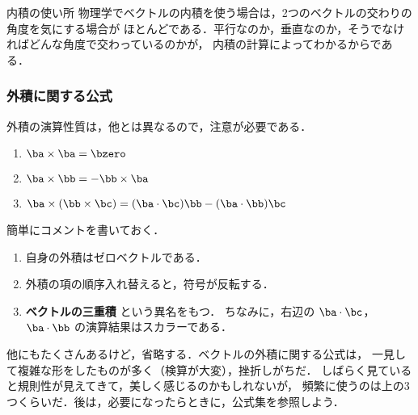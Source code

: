             \begin{mysmallsec}{内積の使い所}
                物理学でベクトルの内積を使う場合は，2つのベクトルの交わりの角度を気にする場合が
                ほとんどである．平行なのか，垂直なのか，そうでなければどんな角度で交わっているのかが，
                内積の計算によってわかるからである．
            \end{mysmallsec}

        \subsubsection{外積に関する公式}
            外積の演算性質は，他とは異なるので，注意が必要である．
            \begin{enumerate}
                \item $\ba \times \ba = \bzero$
                \item $\ba \times \bb = - \bb \times \ba$
                \item $\ba \times (\bb \times \bc) = (\ba \cdot \bc) \bb - (\ba \cdot \bb) \bc $
            \end{enumerate}

            簡単にコメントを書いておく．
            \begin{enumerate}
                \item 自身の外積はゼロベクトルである．
                \item 外積の項の順序入れ替えると，符号が反転する．
                \item \textbf{ベクトルの三重積} という異名をもつ．
                      ちなみに，右辺の $\ba \cdot \bc$，$\ba \cdot \bb$ の演算結果はスカラーである．
            \end{enumerate}

            他にもたくさんあるけど，省略する．ベクトルの外積に関する公式は，
            一見して複雑な形をしたものが多く（検算が大変），挫折しがちだ．
            しばらく見ていると規則性が見えてきて，美しく感じるのかもしれないが，
            頻繁に使うのは上の3つくらいだ．後は，必要になったらときに，公式集を参照しよう．

